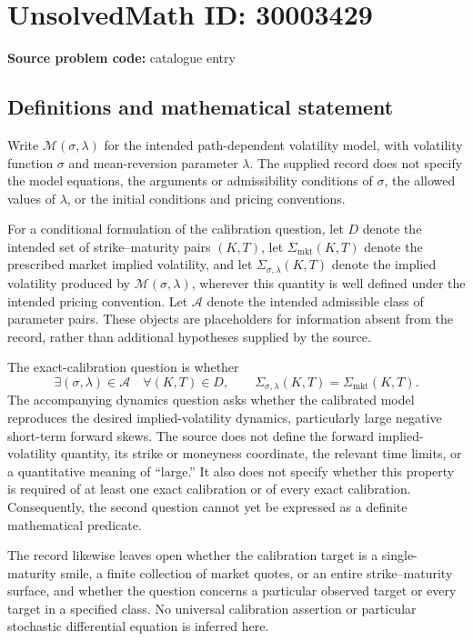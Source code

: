 \documentclass[11pt]{article}
\begin{document}
\section*{UnsolvedMath ID: 30003429}
\textbf{Source problem code:} catalogue entry
\subsection{Definitions and mathematical statement}
Write \(\mathcal M(\sigma,\lambda)\) for the intended path-dependent volatility model, with volatility function \(\sigma\) and mean-reversion parameter \(\lambda\). The supplied record does not specify the model equations, the arguments or admissibility conditions of \(\sigma\), the allowed values of \(\lambda\), or the initial conditions and pricing conventions.

For a conditional formulation of the calibration question, let \(D\) denote the intended set of strike--maturity pairs \((K,T)\), let \(\Sigma_{\mathrm{mkt}}(K,T)\) denote the prescribed market implied volatility, and let \(\Sigma_{\sigma,\lambda}(K,T)\) denote the implied volatility produced by \(\mathcal M(\sigma,\lambda)\), wherever this quantity is well defined under the intended pricing convention. Let \(\mathcal A\) denote the intended admissible class of parameter pairs. These objects are placeholders for information absent from the record, rather than additional hypotheses supplied by the source.

The exact-calibration question is whether
\[
\exists (\sigma,\lambda)\in\mathcal A\quad
\forall (K,T)\in D,\qquad
\Sigma_{\sigma,\lambda}(K,T)=\Sigma_{\mathrm{mkt}}(K,T).
\]
The accompanying dynamics question asks whether the calibrated model reproduces the desired implied-volatility dynamics, particularly large negative short-term forward skews. The source does not define the forward implied-volatility quantity, its strike or moneyness coordinate, the relevant time limits, or a quantitative meaning of ``large.'' It also does not specify whether this property is required of at least one exact calibration or of every exact calibration. Consequently, the second question cannot yet be expressed as a definite mathematical predicate.

The record likewise leaves open whether the calibration target is a single-maturity smile, a finite collection of market quotes, or an entire strike--maturity surface, and whether the question concerns a particular observed target or every target in a specified class. No universal calibration assertion or particular stochastic differential equation is inferred here.
\end{document}
